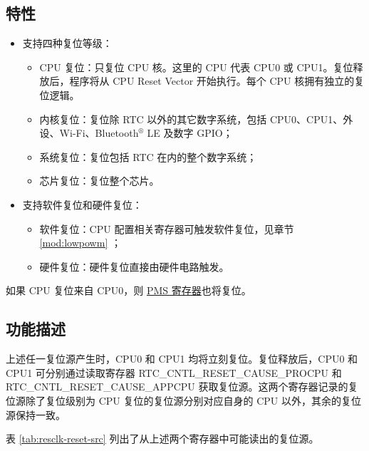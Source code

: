 \documentclass[main\_\_CN.tex]{subfiles}
\begin{document}
\subsection{特性}
\begin{itemize}
    \item 支持四种复位等级：
    \begin{itemize}
    \item CPU 复位：只复位 CPU 核。这里的 CPU 代表 CPU0 或 CPU1。复位释放后，程序将从 CPU Reset Vector 开始执行。每个 CPU 核拥有独立的复位逻辑。
    \item 内核复位：复位除 RTC 以外的其它数字系统，包括 CPU0、CPU1、外设、Wi-Fi、Bluetooth$^®$ LE 及数字 GPIO；
    \item 系统复位：复位包括 RTC 在内的整个数字系统；
    \item 芯片复位：复位整个芯片。
    \end{itemize}

    \item 支持软件复位和硬件复位：
    \begin{itemize}
        \item 软件复位：CPU 配置相关寄存器可触发软件复位，见章节 \ref{mod:lowpowm} \textit{}；
        \item 硬件复位：硬件复位直接由硬件电路触发。
    \end{itemize}
\end{itemize}
\begin{tiplisting}
如果 CPU 复位来自 CPU0，则 \hyperref[mod:permctrl]{PMS 寄存器}也将复位。
\end{tiplisting}

\subsection{功能描述}
上述任一复位源产生时，CPU0 和 CPU1 均将立刻复位。复位释放后，CPU0 和 CPU1 可分别通过读取寄存器 RTC\_CNTL\_RESET\_CAUSE\_PROCPU 和 RTC\_CNTL\_RESET\_CAUSE\_APPCPU 获取复位源。这两个寄存器记录的复位源除了复位级别为 CPU 复位的复位源分别对应自身的 CPU 以外，其余的复位源保持一致。

表 \ref{tab:resclk-reset-src} 列出了从上述两个寄存器中可能读出的复位源。
\end{document}
